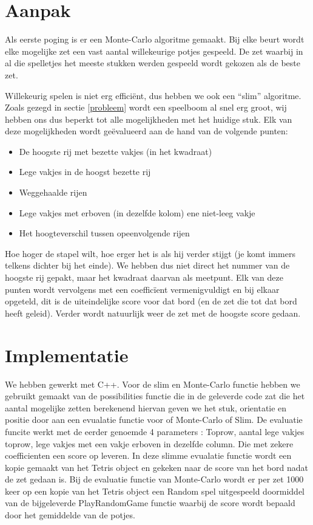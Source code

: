 \documentclass[10pt]{article}
\begin{document}
\section{Aanpak}

Als eerste poging is er een Monte-Carlo algoritme gemaakt. Bij elke beurt wordt elke mogelijke zet een vast aantal willekeurige potjes gespeeld. De zet waarbij in al die spelletjes het meeste stukken werden gespeeld wordt gekozen als de beste zet.

Willekeurig spelen is niet erg effici\"{e}nt, dus hebben we ook een ``slim'' algoritme. Zoals gezegd in sectie \ref{probleem} wordt een speelboom al snel erg groot, wij hebben ons dus beperkt tot alle mogelijkheden met het huidige stuk. Elk van deze mogelijkheden wordt ge\"{e}valueerd aan de hand van de volgende punten:
\begin{itemize}

\item De hoogste rij met bezette vakjes (in het kwadraat)

\item Lege vakjes in de hoogst bezette rij

\item Weggehaalde rijen

\item Lege vakjes met erboven (in dezelfde kolom) ene niet-leeg vakje

\item Het hoogteverschil tussen opeenvolgende rijen

\end{itemize}
Hoe hoger de stapel wilt, hoe erger het is als hij verder stijgt (je komt immers telkens dichter bij het einde). We hebben dus niet direct het nummer van de hoogste rij gepakt, maar het kwadraat daarvan als meetpunt. Elk van deze punten wordt vervolgens met een coeffic\"{i}ent vermenigvuldigt en bij elkaar opgeteld, dit is de uiteindelijke score voor dat bord (en de zet die tot dat bord heeft geleid). Verder wordt natuurlijk weer de zet met de hoogste score gedaan.

\section{Implementatie}

We hebben gewerkt met C++. Voor de slim en Monte-Carlo functie hebben we gebruikt gemaakt van de possibilities functie die in de geleverde code zat die het aantal mogelijke zetten berekenend hiervan geven we het stuk, orientatie en positie door aan een evualatie functie voor of Monte-Carlo of Slim. De evaluatie funcite werkt met de eerder genoemde 4 parameters : Toprow, aantal lege vakjes toprow, lege vakjes met een vakje erboven in dezelfde column. Die met zekere coefficienten een score op leveren. In deze slimme evualatie functie wordt een kopie gemaakt van het Tetris object en gekeken naar de score van het bord nadat de zet gedaan is. Bij de evaluatie functie van Monte-Carlo wordt er per zet 1000 keer op een kopie van het Tetris object een Random spel uitgespeeld doormiddel van de bijgeleverde PlayRandomGame functie waarbij de score wordt bepaald door het gemiddelde van de potjes.
\end{document}
